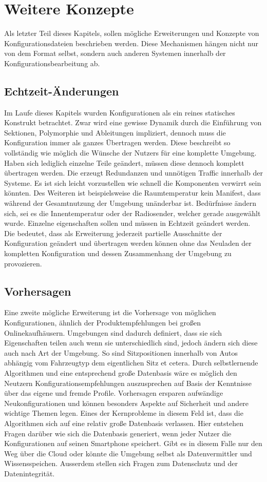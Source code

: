 \section{Weitere Konzepte}
Als letzter Teil dieses Kapitels, sollen mögliche Erweiterungen und Konzepte von Konfigurationsdateien beschrieben werden. Diese Mechanismen hängen nicht nur von dem Format selbst, sondern auch anderen Systemen innerhalb der Konfigurationsbearbeitung ab. 

\subsection{Echtzeit-Änderungen}
Im Laufe dieses Kapitels wurden Konfigurationen als ein reines statisches Konstrukt betrachtet. Zwar wird eine gewisse Dynamik durch die Einführung von Sektionen, Polymorphie und Ableitungen impliziert, dennoch muss die Konfiguration immer als ganzes Übertragen werden. Diese beschreibt so vollständig wie möglich die Wünsche der Nutzers für eine komplette Umgebung. Haben sich lediglich einzelne Teile geändert, müssen diese dennoch komplett übertragen werden. Die erzeugt Redundanzen und unnötigen Traffic innerhalb der Systeme. Es ist sich leicht vorzustellen wie schnell die Komponenten verwirrt sein könnten. Des Weiteren ist beispielsweise die Raumtemperatur kein Manifest, dass während der Gesamtnutzung der Umgebung unänderbar ist. Bedürfnisse ändern sich, sei es die Innentemperatur oder der Radiosender, welcher gerade ausgewählt wurde. Einzelne eigenschaften sollen und müssen in Echtzeit geändert werden. Die bedeutet, dass als Erweiterung jederzeit partielle Ausschnitte der Konfiguration geändert und übertragen werden können ohne das Neuladen der kompletten Konfiguration und dessen Zusammenhang der Umgebung zu provozieren.

\subsection{Vorhersagen}
Eine zweite mögliche Erweiterung ist die Vorhersage von möglichen Konfigurationen, ähnlich der Produktempfehlungen bei großen Onlinekaufhäusern. Umgebungen sind dadurch definiert, dass sie sich Eigenschaften teilen auch wenn sie unterschiedlich sind, jedoch ändern sich diese auch nach Art der Umgebung. So sind Sitzpositionen innerhalb von Autos abhängig vom Fahrzeugtyp dem eigentlichen Sitz et cetera. Durch selbstlernende Algorithmen und eine entsprechend große Datenbasis wäre es möglich den Neutzern Konfigurationsempfehlungen auszusprechen auf Basis der Kenntnisse über das eigene und fremde Profile. Vorhersagen ersparen aufwändige Neukonfigurationen und können besonders Aspekte auf Sicherheit und andere wichtige Themen legen. Eines der Kernprobleme in diesem Feld ist, dass die Algorithmen sich auf eine relativ große Datenbasis verlassen. Hier entstehen Fragen darüber wie sich die Datenbasis generiert, wenn jeder Nutzer die Konfigurationen auf seinen Smartphone speichert. Gibt es in diesem Falle nur den Weg über die Cloud oder könnte die Umgebung selbst als Datenvermittler und Wissensspeichen. Ausserdem stellen sich Fragen zum Datenschutz und der Datenintegrität. 

